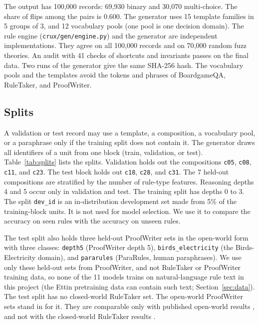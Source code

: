 \documentclass[11pt,a4paper]{article}
\begin{document}
The output has 100{,}000 records: 69{,}930 binary and 30{,}070 multi-choice.
The share of flips among the pairs is $0.600$.
The generator uses 15 template families in 5 groups of 3, and 12 vocabulary pools (one pool is one decision domain).
The rule engine (\texttt{crux/gen/engine.py}) and the generator are independent implementations.
They agree on all 100{,}000 records and on 70{,}000 random fuzz theories.
An audit with 41 checks of shortcuts and invariants passes on the final data.
Two runs of the generator give the same SHA-256 hash.
The vocabulary pools and the templates avoid the tokens and phrases of BoardgameQA, RuleTaker, and ProofWriter.

\subsection{Splits}

A validation or test record may use a template, a composition, a vocabulary pool, or a paraphrase only if the training split does not contain it.
The generator draws all identifiers of a unit from one block (train, validation, or test).
Table~\ref{tab:splits} lists the splits.
Validation holds out the compositions \texttt{c05}, \texttt{c08}, \texttt{c11}, and \texttt{c23}.
The test block holds out \texttt{c18}, \texttt{c28}, and \texttt{c31}.
The 7 held-out compositions are stratified by the number of rule-type features.
Reasoning depths 4 and 5 occur only in validation and test.
The training split has depths 0 to 3.
The split \texttt{dev\_id} is an in-distribution development set made from 5\% of the training-block units.
It is not used for model selection.
We use it to compare the accuracy on seen rules with the accuracy on unseen rules.

The test split also holds three held-out ProofWriter sets in the open-world form with three classes: \texttt{depth5} (ProofWriter depth 5), \texttt{birds\_electricity} (the Birds-Electricity domain), and \texttt{pararules} (ParaRules, human paraphrases).
We use only these held-out sets from ProofWriter, and not RuleTaker or ProofWriter training data, so none of the 11 models trains on natural-language rule text in this project (the Ettin pretraining data can contain such text; Section~\ref{sec:data}).
The test split has no closed-world RuleTaker set.
The open-world ProofWriter sets stand in for it.
They are comparable only with published open-world results \cite{tafjord2021}, and not with the closed-world RuleTaker results \cite{clark2020}.
\end{document}
